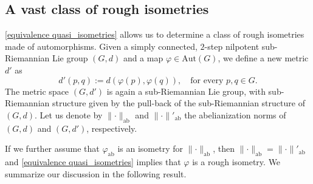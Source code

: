 \documentclass[a4paper,11pt,reqno]{amsart}
\theoremstyle{plain}
\newtheorem{proposition}[theorem]{Proposition}
\theoremstyle{definition}
\renewcommand{\H}{\mathbb H}
\newcommand{\vphi}{\varphi}
\newcommand{\vol}{\mathrm{vol}}
\begin{document}


\subsection{A vast class of rough isometries} \label{vast class}
\cref{equivalence quasi_isometries} allows us to determine a class of rough isometries made of automorphisms. Given a simply connected, $2$-step nilpotent sub-Riemannian Lie group $(G,d)$ and a map $\vphi \in \mathrm{Aut}(G)$, we define a new metric $d'$ as
 \begin{equation*}
 d'(p,q) := d(\vphi(p),\vphi(q)), \quad \text{for every $p,q \in G$.}
 \end{equation*}
 The metric space $(G, d')$ is again a sub-Riemannian Lie group, with sub-Riemannian structure given by the pull-back of the sub-Riemannian structure of $(G,d)$. Let us denote by $\lVert \cdot \rVert_\mathrm{ab}$ and $\lVert \cdot \rVert'_\mathrm{ab}$ the abelianization norms of $(G,d)$ and $(G,d')$, respectively.

 If we further assume that $\vphi_\mathrm{ab}$ is an isometry for $\lVert \cdot \rVert_\mathrm{ab}$, then $\lVert \cdot \rVert_\mathrm{ab} = \lVert \cdot \rVert'_\mathrm{ab}$ and \cref{equivalence quasi_isometries} implies that $\vphi$ is a rough isometry. We summarize our discussion in the following result.
\end{document}
